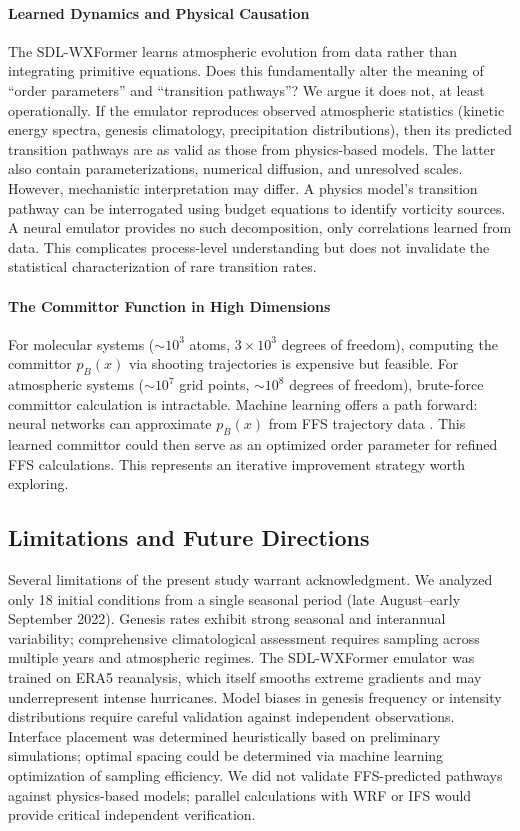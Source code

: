 \documentclass[11pt]{article}
\begin{document}
\paragraph{Learned Dynamics and Physical Causation}
The SDL-WXFormer learns atmospheric evolution from data rather than integrating primitive equations. Does this fundamentally alter the meaning of ``order parameters'' and ``transition pathways''? We argue it does not, at least operationally. If the emulator reproduces observed atmospheric statistics (kinetic energy spectra, genesis climatology, precipitation distributions), then its predicted transition pathways are as valid as those from physics-based models. The latter also contain parameterizations, numerical diffusion, and unresolved scales. However, mechanistic interpretation may differ. A physics model's transition pathway can be interrogated using budget equations to identify vorticity sources. A neural emulator provides no such decomposition, only correlations learned from data. This complicates process-level understanding but does not invalidate the statistical characterization of rare transition rates.

\paragraph{The Committor Function in High Dimensions}
For molecular systems ($\sim 10^3$ atoms, $3 \times 10^3$ degrees of freedom), computing the committor $p_B(x)$ via shooting trajectories is expensive but feasible. For atmospheric systems ($\sim 10^7$ grid points, $\sim 10^8$ degrees of freedom), brute-force committor calculation is intractable. Machine learning offers a path forward: neural networks can approximate $p_B(x)$ from FFS trajectory data \citep{rotskoff2018machine}. This learned committor could then serve as an optimized order parameter for refined FFS calculations. This represents an iterative improvement strategy worth exploring.

\subsection{Limitations and Future Directions}

Several limitations of the present study warrant acknowledgment. We analyzed only 18 initial conditions from a single seasonal period (late August--early September 2022). Genesis rates exhibit strong seasonal and interannual variability; comprehensive climatological assessment requires sampling across multiple years and atmospheric regimes. The SDL-WXFormer emulator was trained on ERA5 reanalysis, which itself smooths extreme gradients and may underrepresent intense hurricanes. Model biases in genesis frequency or intensity distributions require careful validation against independent observations. Interface placement was determined heuristically based on preliminary simulations; optimal spacing could be determined via machine learning optimization of sampling efficiency. We did not validate FFS-predicted pathways against physics-based models; parallel calculations with WRF or IFS would provide critical independent verification.
\end{document}
